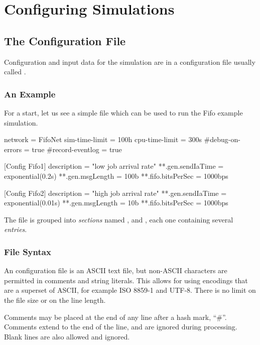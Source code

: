 \chapter{Configuring Simulations}
\label{cha:config-sim}

\section{The Configuration File}
\label{sec:config-sim:config-file}

Configuration and input data for the simulation are in
a configuration file usually called .

\subsection{An Example}
\label{sec:config-sim:example-inifile}

For a start, let us see a simple  file which
can be used to run the Fifo example simulation.

\begin{inifile}
[General]
network = FifoNet
sim-time-limit = 100h
cpu-time-limit = 300s
#debug-on-errors = true
#record-eventlog = true

[Config Fifo1]
description = "low job arrival rate"
**.gen.sendIaTime = exponential(0.2s)
**.gen.msgLength = 100b
**.fifo.bitsPerSec = 1000bps

[Config Fifo2]
description = "high job arrival rate"
**.gen.sendIaTime = exponential(0.01s)
**.gen.msgLength = 10b
**.fifo.bitsPerSec = 1000bps
\end{inifile}

The file is grouped into \textit{sections} named \ttt{[General]}, 
and , each one containing several \textit{entries}.


\subsection{File Syntax}
\label{sec:config-sim:inifile-syntax}

An {\opp} configuration file is an ASCII text file, but non-ASCII
characters are permitted in comments and string literals. This allows for
using encodings that are a superset of ASCII, for example ISO 8859-1 and
UTF-8. There is no limit on the file size or on the line length.

Comments may be placed at the end of any line after a hash mark, ``\#''.
Comments extend to the end of the line, and are ignored during processing.
Blank lines are also allowed and ignored.


